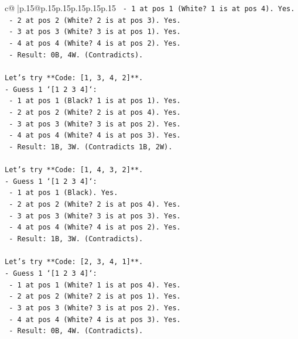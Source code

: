 \documentclass{article}
\begin{document}
{\begin{supertabular}{c@{$\;$}|p{.15\linewidth}@{}p{.15\linewidth}p{.15\linewidth}p{.15\linewidth}p{.15\linewidth}p{.15\linewidth}}
{{{\texttt{  {-} 1 at pos 1 (White? 1 is at pos 4). Yes.} \\
\texttt{  {-} 2 at pos 2 (White? 2 is at pos 3). Yes.} \\
\texttt{  {-} 3 at pos 3 (White? 3 is at pos 1). Yes.} \\
\texttt{  {-} 4 at pos 4 (White? 4 is at pos 2). Yes.} \\
\texttt{  {-} Result: 0B, 4W. (Contradicts).} \\
\\ 
\texttt{Let's try **Code: {[}1, 3, 4, 2{]}**.} \\
\texttt{{-} Guess 1 `{[}1 2 3 4{]}`:} \\
\texttt{  {-} 1 at pos 1 (Black? 1 is at pos 1). Yes.} \\
\texttt{  {-} 2 at pos 2 (White? 2 is at pos 4). Yes.} \\
\texttt{  {-} 3 at pos 3 (White? 3 is at pos 2). Yes.} \\
\texttt{  {-} 4 at pos 4 (White? 4 is at pos 3). Yes.} \\
\texttt{  {-} Result: 1B, 3W. (Contradicts 1B, 2W).} \\
\\ 
\texttt{Let's try **Code: {[}1, 4, 3, 2{]}**.} \\
\texttt{{-} Guess 1 `{[}1 2 3 4{]}`:} \\
\texttt{  {-} 1 at pos 1 (Black). Yes.} \\
\texttt{  {-} 2 at pos 2 (White? 2 is at pos 4). Yes.} \\
\texttt{  {-} 3 at pos 3 (White? 3 is at pos 3). Yes.} \\
\texttt{  {-} 4 at pos 4 (White? 4 is at pos 2). Yes.} \\
\texttt{  {-} Result: 1B, 3W. (Contradicts).} \\
\\ 
\texttt{Let's try **Code: {[}2, 3, 4, 1{]}**.} \\
\texttt{{-} Guess 1 `{[}1 2 3 4{]}`:} \\
\texttt{  {-} 1 at pos 1 (White? 1 is at pos 4). Yes.} \\
\texttt{  {-} 2 at pos 2 (White? 2 is at pos 1). Yes.} \\
\texttt{  {-} 3 at pos 3 (White? 3 is at pos 2). Yes.} \\
\texttt{  {-} 4 at pos 4 (White? 4 is at pos 3). Yes.} \\
\texttt{  {-} Result: 0B, 4W. (Contradicts).} \\
\\ 
}}}
\end{supertabular}}
\end{document}

